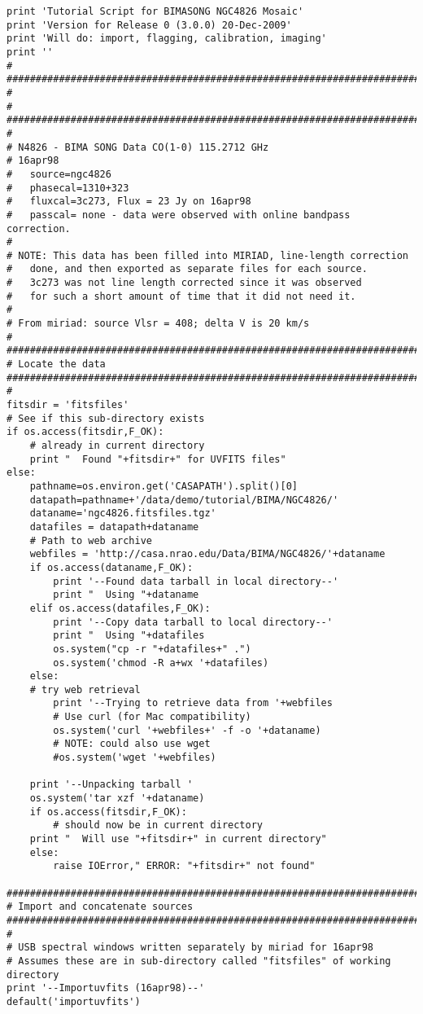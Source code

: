 \begin{verbatim}
print 'Tutorial Script for BIMASONG NGC4826 Mosaic'
print 'Version for Release 0 (3.0.0) 20-Dec-2009'
print 'Will do: import, flagging, calibration, imaging'
print ''
#
##########################################################################
#
# 
##########################################################################
#
# N4826 - BIMA SONG Data CO(1-0) 115.2712 GHz
# 16apr98
#	source=ngc4826
#	phasecal=1310+323
#	fluxcal=3c273, Flux = 23 Jy on 16apr98
#	passcal= none - data were observed with online bandpass correction.
#
# NOTE: This data has been filled into MIRIAD, line-length correction 
#	done, and then exported as separate files for each source.
#	3c273 was not line length corrected since it was observed
#	for such a short amount of time that it did not need it.  
#
# From miriad: source Vlsr = 408; delta V is 20 km/s 
#
##########################################################################
# Locate the data
##########################################################################
#
fitsdir = 'fitsfiles'
# See if this sub-directory exists
if os.access(fitsdir,F_OK):
    # already in current directory
    print "  Found "+fitsdir+" for UVFITS files"
else:
    pathname=os.environ.get('CASAPATH').split()[0]
    datapath=pathname+'/data/demo/tutorial/BIMA/NGC4826/'
    dataname='ngc4826.fitsfiles.tgz'
    datafiles = datapath+dataname
    # Path to web archive
    webfiles = 'http://casa.nrao.edu/Data/BIMA/NGC4826/'+dataname
    if os.access(dataname,F_OK):
        print '--Found data tarball in local directory--'
        print "  Using "+dataname
    elif os.access(datafiles,F_OK):
        print '--Copy data tarball to local directory--'
        print "  Using "+datafiles
        os.system("cp -r "+datafiles+" .")
        os.system('chmod -R a+wx '+datafiles)
    else:
	# try web retrieval
        print '--Trying to retrieve data from '+webfiles
        # Use curl (for Mac compatibility)
        os.system('curl '+webfiles+' -f -o '+dataname)
        # NOTE: could also use wget
        #os.system('wget '+webfiles)
        
    print '--Unpacking tarball '
    os.system('tar xzf '+dataname)
    if os.access(fitsdir,F_OK):
        # should now be in current directory
	print "  Will use "+fitsdir+" in current directory"
    else:
        raise IOError," ERROR: "+fitsdir+" not found"

##########################################################################
# Import and concatenate sources
##########################################################################
#
# USB spectral windows written separately by miriad for 16apr98
# Assumes these are in sub-directory called "fitsfiles" of working directory
print '--Importuvfits (16apr98)--'
default('importuvfits')


\end{verbatim}

